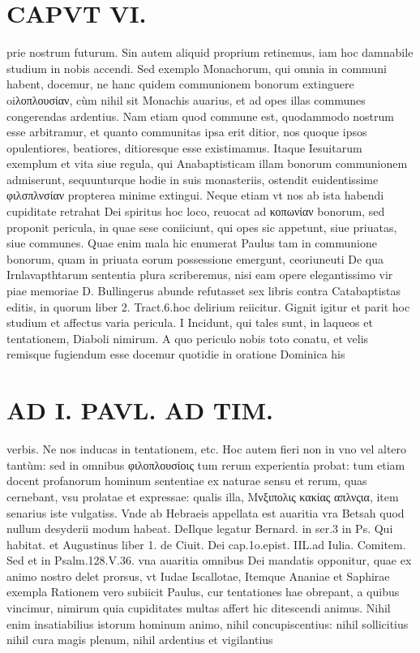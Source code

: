 \documentclass{article}
\begin{document}
\begin{pages}
\section*{CAPVT  VI. }
\marginpar{[ p.449 ]}\pstart prie nostrum futurum. Sin autem aliquid proprium retinemus, iam hoc damnabile studium in nobis accendi. Sed exemplo Monachorum, qui omnia in communi habent, docemur, ne hanc quidem communionem bonorum extinguere oiλοπλουσίαν, cùm nihil sit Monachis auarius, et ad opes illas communes congerendas ardentius. Nam etiam quod commune est, quodammodo nostrum esse arbitramur, et quanto communitas ipsa erit ditior, nos quoque  ipsos opulentiores, beatiores, ditioresque esse existimamus. Itaque Iesuitarum exemplum et vita siue regula, qui Anabaptisticam illam bonorum communionem admiserunt, sequunturque hodie in suis monasteriis, ostendit euidentissime φιλσπλνσίαν propterea minime extingui. Neque etiam vt nos ab ista habendi cupiditate retrahat Dei spiritus hoc loco, reuocat ad κοπωνίαν bonorum, sed proponit pericula, in quae sese coniiciunt, qui opes sic appetunt, siue priuatas, siue communes. Quae enim mala hic enumerat Paulus tam in communione bonorum, quam in priuata eorum possessione emergunt, ceoriuneuti De qua Irnlavapthtarum sententia plura scriberemus, nisi eam opere elegantissimo vir piae memoriae D. Bullingerus abunde refutasset sex libris contra Catabaptistas editis, in quorum liber 2. Tract.6.hoc delirium reiicitur.  \pend\pstart Gignit igitur et parit hoc studium et affectus varia pericula.  \pend\pstart I Incidunt, qui tales sunt, in laqueos et tentationem, Diaboli nimirum. A quo periculo nobis toto conatu, et velis remisque fugiendum esse docemur quotidie in oratione Dominica his  \pend
\section*{AD I. PAVL. AD TIM. }
\marginpar{[ p.450 ]}\pstart verbis. Ne nos inducas in tentationem, etc. Hoc autem fieri non in vno vel altero tantùm: sed in omnibus φιλοπλουσίοις tum rerum experientia probat: tum etiam docent profanorum hominum sententiae ex naturae sensu et rerum, quas cernebant, vsu prolatae et expressae: qualis illa, Μνξιπολις κακίας απλνςια, item senarius iste vulgatiss.  \pend\pstart Vnde ab Hebraeis appellata est auaritia vra Betsah quod nullum desyderii modum habeat. DeIlque legatur Bernard. in ser.3 in Ps. Qui habitat. et Augustinus liber 1. de Ciuit. Dei cap.1o.epist. IIL.ad Iulia. Comitem. Sed et in Psalm.128.V.36. vna auaritia omnibus Dei mandatis opponitur, quae ex animo nostro delet prorsus, vt Iudae Iscallotae, Itemque Ananiae et Saphirae exempla  \pend\pstart Rationem vero subiicit Paulus, cur tentationes hae obrepant, a quibus vincimur, nimirum quia cupiditates multas affert hic ditescendi animus. Nihil enim insatiabilius istorum hominum animo, nihil concupiscentius: nihil sollicitius nihil cura magis plenum, nihil ardentius et vigilantius  \pend

\end{pages}
\end{document}
